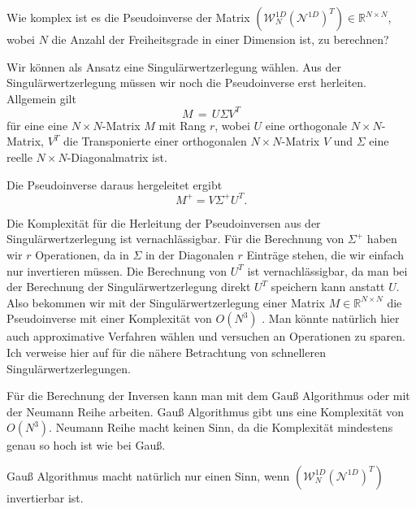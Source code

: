 Wie komplex ist es die Pseudoinverse der Matrix $(\mathcal{W}_N^{1D} (\mathcal{N}^{1D})^T) \in \mathbb{R}^{N \times N}$, wobei $N$ die Anzahl der Freiheitsgrade in einer Dimension ist, zu berechnen?

Wir können als Ansatz eine Singulärwertzerlegung wählen. Aus der Singulärwertzerlegung müssen wir noch die Pseudoinverse erst herleiten.
Allgemein gilt
\begin{equation*}
M\,=\,U\Sigma V^{T}
\end{equation*}
für eine eine $N \times N$-Matrix $M$ mit Rang $r$, wobei
$U$ eine orthogonale $N\times N$-Matrix, $V^{T}$ die Transponierte einer orthogonalen $N \times N$-Matrix $V$ und
$\Sigma$  eine reelle  $N\times N$-Diagonalmatrix ist.

Die Pseudoinverse daraus hergeleitet ergibt
\begin{equation*}
M^{+}=V\Sigma ^{+}U^{T}.
\end{equation*}

Die Komplexität für die Herleitung der Pseudoinversen aus der Singulärwertzerlegung ist vernachlässigbar. Für die Berechnung von $\Sigma^+$ haben wir $r$ Operationen, da in $\Sigma$ in der Diagonalen $r$ Einträge stehen, die wir einfach nur invertieren müssen. Die Berechnung von $U^{T}$ ist vernachlässigbar, da man bei der Berechnung der Singulärwertzerlegung direkt $U^{T}$ speichern kann anstatt $U$.
Also bekommen wir mit der Singulärwertzerlegung einer Matrix $M \in \mathbb{R}^{N \times N}$ die Pseudoinverse mit einer Komplexität von $O(N^3)$ \cite[2]{SVD}. Man könnte natürlich hier auch approximative Verfahren wählen und versuchen an Operationen zu sparen. Ich verweise hier auf \cite{SVD} für die nähere Betrachtung von schnelleren Singulärwertzerlegungen.

Für die Berechnung der Inversen kann man mit dem Gauß Algorithmus oder mit der Neumann Reihe arbeiten. Gauß Algorithmus gibt uns eine Komplexität von $O(N^3)$. 
Neumann Reihe macht keinen Sinn, da die Komplexität mindestens genau so hoch ist wie bei Gauß.

Gauß Algorithmus macht natürlich nur einen Sinn, wenn $(\mathcal{W}_N^{1D} (\mathcal{N}^{1D})^T)$ invertierbar ist.

